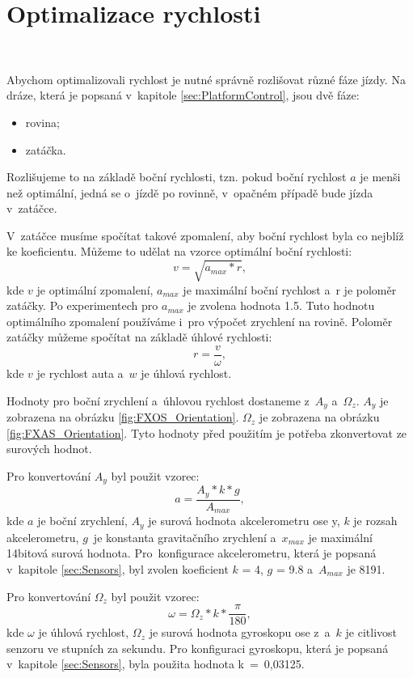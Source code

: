 \chapter{Optimalizace rychlosti}
\label{sec:SpeedOptimization}
\

Abychom optimalizovali rychlost je nutné správně rozlišovat různé fáze jízdy. Na
dráze, která je popsaná v~kapitole \ref{sec:PlatformControl}, jsou dvě fáze:
\begin{itemize}
	\item{rovina;}
	\item{zatáčka.}
\end{itemize}

Rozlišujeme to na základě boční rychlosti, tzn. pokud boční rychlost $a$ je menši než
optimální, jedná se o~jízdě po rovinně, v~opačném případě bude jízda v~zatáčce.

V~zatáčce musíme spočítat takové zpomalení, aby boční rychlost byla
co nejblíž ke koeficientu. Můžeme to udělat na vzorce optimální boční
rychlosti:
\begin{equation}
v = \sqrt{a_{max} * r},
\end{equation}
kde $v$ je optimální zpomalení, $a_{max}$ je maximální boční rychlost a~r je poloměr
zatáčky. Po experimentech pro $a_{max}$ je zvolena hodnota 1.5. Tuto hodnotu
optimálního zpomalení používáme i~pro výpočet zrychlení na rovině. Poloměr zatáčky můžeme
spočítat na základě úhlové rychlosti:
\begin{equation}
r = \frac{v}{\omega},
\end{equation}
kde $v$ je rychlost auta a~$w$ je úhlová rychlost.

Hodnoty pro boční zrychlení a~úhlovou rychlost dostaneme z~$A_y$ a~$\Omega_z$. $A_y$ je
zobrazena na obrázku \ref{fig:FXOS_Orientation}. $\Omega_z$ je zobrazena na obrázku
\ref{fig:FXAS_Orientation}.
Tyto hodnoty před použitím je potřeba zkonvertovat ze surových
hodnot.

Pro konvertování $A_y$ byl použit vzorec:
\begin{equation}
a = \frac{A_y * k * g}{A_{max}},
\end{equation}
kde $a$ je boční zrychlení, $A_y$ je surová hodnota akcelerometru ose y,
$k$ je rozsah akcelerometru,  $g$~je konstanta gravitačního zrychlení a~$x_{max}$ je
maximální 14bitová surová hodnota.  Pro~konfigurace akcelerometru, která je popsaná v~kapitole
\ref{sec:Sensors}, byl zvolen koeficient $k$ = 4, $g$ = 9.8 a~$A_{max}$ je 8191.

Pro konvertování $\Omega_z$ byl použit vzorec:
\begin{equation}
\omega = \Omega_z * k * \frac{\pi}{180},
\end{equation}
kde $\omega$ je úhlová rychlost, $\Omega_z$ je surová hodnota gyroskopu ose
z~a~$k$ je citlivost senzoru ve stupních za sekundu.
Pro konfiguraci gyroskopu, která je popsaná v~kapitole
\ref{sec:Sensors}, byla použita hodnota k~=~0,03125.

\endinput
